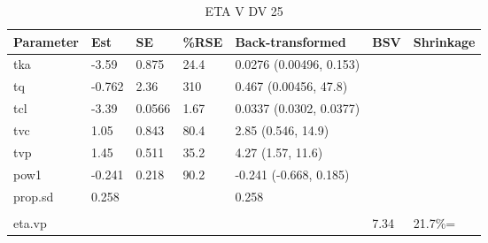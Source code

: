 \begin{table}
\centering\centering
\caption{ETA V DV 25}
\centering
\fontsize{8}{10}\selectfont
\begin{tabular}[t]{lllllll}
\toprule
\textbf{Parameter} & \textbf{Est} & \textbf{SE} & \textbf{\%RSE} & \textbf{Back-transformed} & \textbf{BSV} & \textbf{Shrinkage}\\
\midrule
tka & -3.59 & 0.875 & 24.4 & 0.0276 (0.00496, 0.153) &  & \\
\midrule
tq & -0.762 & 2.36 & 310 & 0.467 (0.00456, 47.8) &  & \\
\midrule
tcl & -3.39 & 0.0566 & 1.67 & 0.0337 (0.0302, 0.0377) &  & \\
\midrule
tvc & 1.05 & 0.843 & 80.4 & 2.85 (0.546, 14.9) &  & \\
\midrule
tvp & 1.45 & 0.511 & 35.2 & 4.27 (1.57, 11.6) &  & \\
\midrule
pow1 & -0.241 & 0.218 & 90.2 & -0.241 (-0.668, 0.185) &  & \\
\midrule
prop.sd & 0.258 &  &  & 0.258 &  & \\
\midrule\\
eta.vp &  &  &  &  & 7.34 & 21.7\%=\\
\bottomrule
\end{tabular}
\end{table}